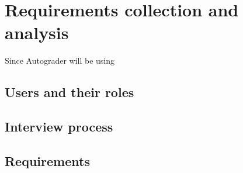 \section{Requirements collection and analysis}
Since Autograder will be using 



\subsection{Users and their roles}

\subsection{Interview process}

\subsection{Requirements}









